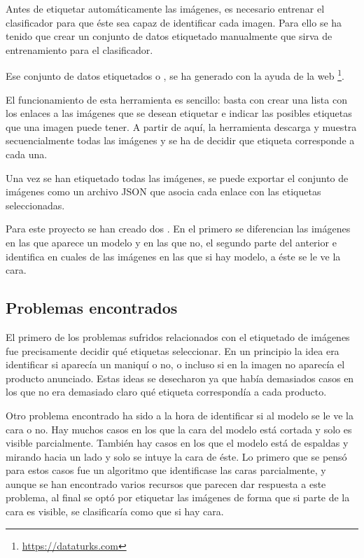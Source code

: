 Antes de etiquetar automáticamente las imágenes, es necesario entrenar el clasificador para que éste sea capaz de identificar cada imagen. Para ello se ha tenido que crear un conjunto de datos etiquetado manualmente que sirva de entrenamiento para el clasificador.

Ese conjunto de datos etiquetados o , se ha generado con la ayuda de la web \footnote{\url{https://dataturks.com}}.

El funcionamiento de esta herramienta es sencillo: basta con crear una lista con los enlaces a las imágenes que se desean etiquetar e indicar las posibles etiquetas que una imagen puede tener. A partir de aquí, la herramienta descarga y muestra secuencialmente todas las imágenes y se ha de decidir que etiqueta corresponde a cada una.


Una vez se han etiquetado todas las imágenes, se puede exportar el conjunto de imágenes como un archivo JSON que asocia cada enlace con las etiquetas seleccionadas.

Para este proyecto se han creado dos . En el primero se diferencian las imágenes en las que aparece un modelo y en las que no, el segundo  parte del anterior e identifica en cuales de las imágenes en las que si hay modelo, a éste se le ve la cara.

\subsection{Problemas encontrados}

El primero de los problemas sufridos relacionados con el etiquetado de imágenes fue precisamente decidir qué etiquetas seleccionar. En un principio la idea era identificar si aparecía un maniquí o no, o incluso si en la imagen no aparecía el producto anunciado. Estas ideas se desecharon ya que había demasiados casos en los que no era demasiado claro qué etiqueta correspondía a cada producto.

Otro problema encontrado ha sido a la hora de identificar si al modelo se le ve la cara o no. Hay muchos casos en los que la cara del modelo está cortada y solo es visible parcialmente. También hay casos en los que el modelo está de espaldas y mirando hacia un lado y solo se intuye la cara de éste. Lo primero que se pensó para estos casos fue un algoritmo que identificase las caras parcialmente, y aunque se han encontrado varios recursos que parecen dar respuesta a este problema, al final se optó por etiquetar las imágenes de forma que si parte de la cara es visible, se clasificaría como que si hay cara.

